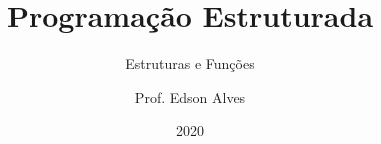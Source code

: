 \title{Programação Estruturada}
\subtitle{Estruturas e Funções}
\date{2020}
\author{Prof. Edson Alves}

